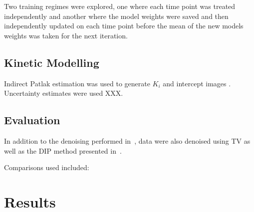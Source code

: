         Two training regimes were explored, one where each time point was treated independently and another where the model weights were saved and then independently updated on each time point before the mean of the new models weights was taken for the next iteration.
        
    
    \subsection{Kinetic Modelling} \label{sec:kinetic_modelling}
        Indirect Patlak estimation was used to generate $K_i$ and intercept images \cite{patlak1983GraphicalEvaluationBloodtoBrain}. Uncertainty estimates were used XXX.
        
    
    \subsection{Evaluation} \label{sec:evaluation}
        In addition to the denoising performed in~, data were also denoised using \gls{TV} as well as the \gls{DIP} method presented in~\cite{Gong2019PETPrior}.
        
        Comparisons used included: 


\section{Results} \label{sec:results}
        
    
        
        
        
        
